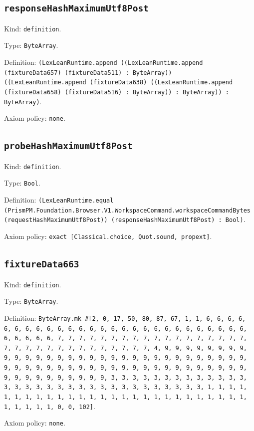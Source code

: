 \documentclass[11pt]{article}
\begin{document}
\subsection*{\texttt{responseHashMaximumUtf8Post}}
\noindent Kind: \texttt{definition}.\par
\noindent Type: \texttt{ByteArray}.\par
\noindent Definition: \texttt{(LexLeanRuntime.append ((LexLeanRuntime.append (fixtureData657) (fixtureData511) : ByteArray)) ((LexLeanRuntime.append (fixtureData638) ((LexLeanRuntime.append (fixtureData658) (fixtureData516) : ByteArray)) : ByteArray)) : ByteArray)}.\par
\noindent Axiom policy: \texttt{none}.\par
\subsection*{\texttt{probeHashMaximumUtf8Post}}
\noindent Kind: \texttt{definition}.\par
\noindent Type: \texttt{Bool}.\par
\noindent Definition: \texttt{(LexLeanRuntime.equal (PrismPM.Foundation.Browser.V1.WorkspaceCommand.workspaceCommandBytes (requestHashMaximumUtf8Post)) (responseHashMaximumUtf8Post) : Bool)}.\par
\noindent Axiom policy: \texttt{exact [Classical.choice, Quot.sound, propext]}.\par
\subsection*{\texttt{fixtureData663}}
\noindent Kind: \texttt{definition}.\par
\noindent Type: \texttt{ByteArray}.\par
\noindent Definition: \texttt{ByteArray.mk \#[2, 0, 17, 50, 80, 87, 67, 1, 1, 6, 6, 6, 6, 6, 6, 6, 6, 6, 6, 6, 6, 6, 6, 6, 6, 6, 6, 6, 6, 6, 6, 6, 6, 6, 6, 6, 6, 6, 6, 6, 6, 7, 7, 7, 7, 7, 7, 7, 7, 7, 7, 7, 7, 7, 7, 7, 7, 7, 7, 7, 7, 7, 7, 7, 7, 7, 7, 7, 7, 7, 7, 7, 7, 4, 9, 9, 9, 9, 9, 9, 9, 9, 9, 9, 9, 9, 9, 9, 9, 9, 9, 9, 9, 9, 9, 9, 9, 9, 9, 9, 9, 9, 9, 9, 9, 9, 9, 9, 9, 9, 9, 9, 9, 9, 9, 9, 9, 9, 9, 9, 9, 9, 9, 9, 9, 9, 9, 9, 9, 9, 9, 9, 9, 9, 9, 9, 9, 9, 3, 3, 3, 3, 3, 3, 3, 3, 3, 3, 3, 3, 3, 3, 3, 3, 3, 3, 3, 3, 3, 3, 3, 3, 3, 3, 3, 3, 3, 3, 3, 3, 1, 1, 1, 1, 1, 1, 1, 1, 1, 1, 1, 1, 1, 1, 1, 1, 1, 1, 1, 1, 1, 1, 1, 1, 1, 1, 1, 1, 1, 1, 1, 1, 0, 0, 102]}.\par
\noindent Axiom policy: \texttt{none}.\par
\end{document}
